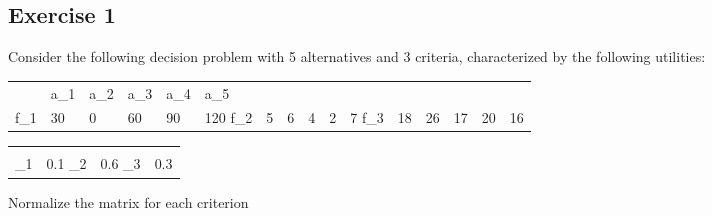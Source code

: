 \documentclass[\main/main.tex]{subfiles}
\begin{document}
\subsection{Exercise 1}
Consider the following decision problem with 5 alternatives and 3 criteria, characterized by the following utilities:

\begin{table}
  \begin{tabular}{L|LLLLL}
     & a_1 & a_2 & a_3 & a_4 & a_5 \\
    f_1               & 30  & 0   & 60  & 90  & 120
    f_2               & 5   & 6   & 4   & 2   & 7
    f_3               & 18  & 26  & 17  & 20  & 16
  \end{tabular}
  \begin{tabular}{L|L}
         &  \\
    \w_1 & 0.1
    \w_2 & 0.6
    \w_3 & 0.3
  \end{tabular}
\end{table}

Normalize the matrix for each criterion
\end{document}
